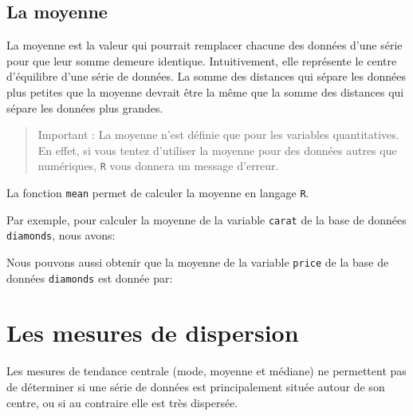 \documentclass[]{book}
\newenvironment{Shaded}{\begin{snugshade}}{\end{snugshade}}
\newcommand{\KeywordTok}[1]{\textcolor[rgb]{0.13,0.29,0.53}{\textbf{#1}}}
\newcommand{\NormalTok}[1]{#1}
\newcommand{\OperatorTok}[1]{\textcolor[rgb]{0.81,0.36,0.00}{\textbf{#1}}}
\theoremstyle{definition}
\theoremstyle{definition}
\theoremstyle{definition}
\theoremstyle{remark}
\begin{document}
\hypertarget{la-moyenne}{%
\subsection{La moyenne}\label{la-moyenne}}

La moyenne est la valeur qui pourrait remplacer chacune des données
d'une série pour que leur somme demeure identique. Intuitivement, elle
représente le centre d'équilibre d'une série de données. La somme des
distances qui sépare les données plus petites que la moyenne devrait
être la même que la somme des distances qui sépare les données plus
grandes.

\begin{quote}
Important : La moyenne n'est définie que pour les variables
quantitatives. En effet, si vous tentez d'utiliser la moyenne pour des
données autres que numériques, \texttt{R} vous donnera un message
d'erreur.
\end{quote}

La fonction \texttt{mean} permet de calculer la moyenne en langage
\texttt{R}.

Par exemple, pour calculer la moyenne de la variable \texttt{carat} de
la base de données \texttt{diamonds}, nous avons:

\begin{Shaded}
\end{Shaded}

Nous pouvons aussi obtenir que la moyenne de la variable \texttt{price}
de la base de données \texttt{diamonds} est donnée par:

\begin{Shaded}
\end{Shaded}

\hypertarget{les-mesures-de-dispersion}{%
\section{Les mesures de dispersion}\label{les-mesures-de-dispersion}}

Les mesures de tendance centrale (mode, moyenne et médiane) ne
permettent pas de déterminer si une série de données est principalement
située autour de son centre, ou si au contraire elle est très dispersée.
\end{document}
